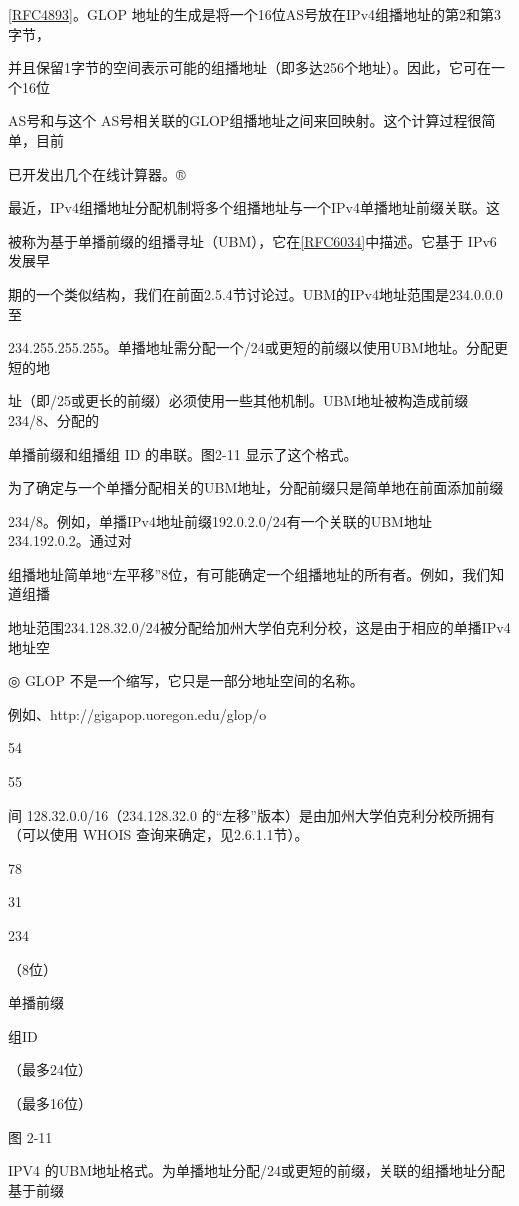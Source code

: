 \href{https://www.rfc-editor.org/rfc/rfc4893}{[RFC4893]}。GLOP 地址的生成是将一个16位AS号放在IPv4组播地址的第2和第3字节，

并且保留1字节的空间表示可能的组播地址（即多达256个地址）。因此，它可在一个16位

AS号和与这个 AS号相关联的GLOP组播地址之间来回映射。这个计算过程很简单，目前

已开发出几个在线计算器。®

最近，IPv4组播地址分配机制将多个组播地址与一个IPv4单播地址前缀关联。这

被称为基于单播前缀的组播寻址（UBM），它在\href{https://www.rfc-editor.org/rfc/rfc6034}{[RFC6034]}中描述。它基于 IPv6 发展早

期的一个类似结构，我们在前面2.5.4节讨论过。UBM的IPv4地址范围是234.0.0.0至

234.255.255.255。单播地址需分配一个/24或更短的前缀以使用UBM地址。分配更短的地

址（即/25或更长的前缀）必须使用一些其他机制。UBM地址被构造成前缀234/8、分配的

单播前缀和组播组 ID 的串联。图2-11 显示了这个格式。

为了确定与一个单播分配相关的UBM地址，分配前缀只是简单地在前面添加前缀

234/8。例如，单播IPv4地址前缀192.0.2.0/24有一个关联的UBM地址234.192.0.2。通过对

组播地址简单地“左平移”8位，有可能确定一个组播地址的所有者。例如，我们知道组播

地址范围234.128.32.0/24被分配给加州大学伯克利分校，这是由于相应的单播IPv4地址空

◎ GLOP 不是一个缩写，它只是一部分地址空间的名称。

例如、http://gigapop.uoregon.edu/glop/o

54

55

间 128.32.0.0/16（234.128.32.0 的“左移”版本）是由加州大学伯克利分校所拥有（可以使用
WHOIS 查询来确定，见2.6.1.1节）。

78

31

234

（8位）

单播前缀

组ID

（最多24位）

（最多16位）

图 2-11

IPV4 的UBM地址格式。为单播地址分配/24或更短的前缀，关联的组播地址分配基于前缀

